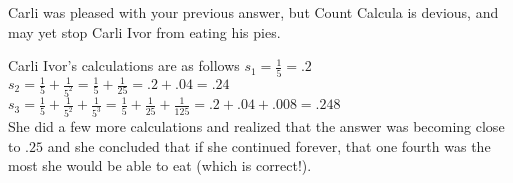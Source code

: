 


 {Carli was pleased with your previous answer, but Count Calcula is devious, and may yet stop Carli Ivor from eating his pies.}




Carli Ivor's calculations are as follows
$s_1=\frac{1}{5}=.2$\\
$s_2=\frac{1}{5}+\frac{1}{5^2}=\frac{1}{5}+\frac{1}{25}=.2+.04=.24$\\
$s_3=\frac{1}{5}+\frac{1}{5^2}+\frac{1}{5^3}=\frac{1}{5}+\frac{1}{25}+\frac{1}{125}=.2+.04+.008=.248$\\

She did a few more calculations and realized that the answer was becoming close to $.25$ and she concluded that if she continued forever, that one fourth was the most she would be able to eat (which is correct!).







